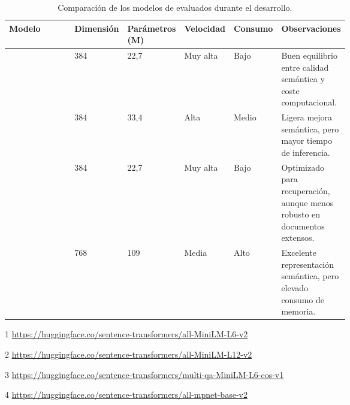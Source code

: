 \begin{landscape}
\begin{table}[p]
	\centering
	\begin{threeparttable}
	\begin{tabularx}{\linewidth}{p{0.26\linewidth} p{0.10\linewidth} p{0.10\linewidth} p{0.10\linewidth} p{0.10\linewidth} X}
		\toprule
		\textbf{Modelo} & \textbf{Dimensión} & \textbf{Parámetros (M)} & \textbf{Velocidad} & \textbf{Consumo} & \textbf{Observaciones} \\
		\midrule
		\href{https://huggingface.co/sentence-transformers/all-MiniLM-L6-v2}{\file{all-MiniLM-L6-v2}}\tnote{1} &
		384 &
		22,7 &
		Muy alta &
		Bajo &
		Buen equilibrio entre calidad semántica y coste computacional. \\
		
		\href{https://huggingface.co/sentence-transformers/all-MiniLM-L12-v2}{\file{all-MiniLM-L12-v2}}\tnote{2} &
		384 &
		33,4 &
		Alta &
		Medio &
		Ligera mejora semántica, pero mayor tiempo de inferencia. \\
		
		\href{https://huggingface.co/sentence-transformers/multi-qa-MiniLM-L6-cos-v1}{\file{multi-qa-MiniLM-L6-cos-v1}}\tnote{3} &
		384 &
		22,7 &
		Muy alta &
		Bajo &
		Optimizado para recuperación, aunque menos robusto en documentos extensos. \\
		
		\href{https://huggingface.co/sentence-transformers/all-mpnet-base-v2}{\file{all-mpnet-base-v2}}\tnote{4} &
		768 &
		109 &
		Media &
		Alto &
		Excelente representación semántica, pero elevado consumo de memoria. \\
		\bottomrule
	\end{tabularx}
	
	\begin{tablenotes}
	\footnotesize
		\item[1] \url{https://huggingface.co/sentence-transformers/all-MiniLM-L6-v2}
		\item[2] \url{https://huggingface.co/sentence-transformers/all-MiniLM-L12-v2}
		\item[3] \url{https://huggingface.co/sentence-transformers/multi-qa-MiniLM-L6-cos-v1}
		\item[4] \url{https://huggingface.co/sentence-transformers/all-mpnet-base-v2}
	\end{tablenotes}
	
	\caption{Comparación de los modelos de  evaluados durante el desarrollo.}
	\label{tabla:experimentos_chunking}
	\end{threeparttable}
\end{table}
\end{landscape}

